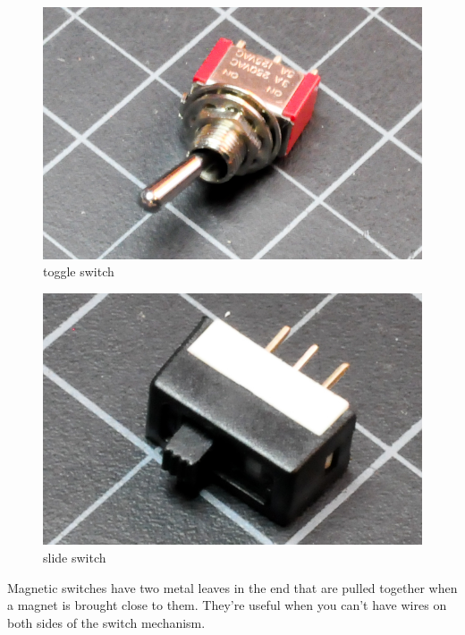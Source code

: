 \begin{figure}[!htb]
 \centering
 \includegraphics[scale=0.3]{img/switches/toggle_switch.jpg}
 \caption{toggle switch}
 \label{toggle switch}
\end{figure}

\begin{figure}[!htb]
 \centering
 \includegraphics[scale=0.3]{img/switches/slide_switch.jpg}
 \caption{slide switch}
 \label{slide switch}
\end{figure}

Magnetic switches have two metal leaves in the end that are pulled together when a magnet is brought close to them. They're useful when you can't have wires on both sides of the switch mechanism.

